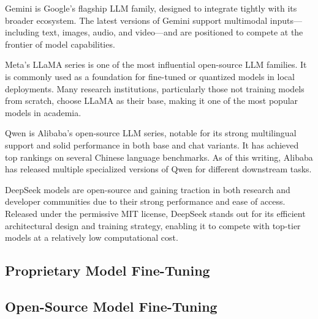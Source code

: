 Gemini is Google’s flagship LLM family, designed to integrate tightly with its broader ecosystem. The latest versions of Gemini support multimodal inputs—including text, images, audio, and video—and are positioned to compete at the frontier of model capabilities.

Meta’s LLaMA series is one of the most influential open-source LLM families. It is commonly used as a foundation for fine-tuned or quantized models in local deployments. Many research institutions, particularly those not training models from scratch, choose LLaMA as their base, making it one of the most popular models in academia.

Qwen is Alibaba’s open-source LLM series, notable for its strong multilingual support and solid performance in both base and chat variants. It has achieved top rankings on several Chinese language benchmarks. As of this writing, Alibaba has released multiple specialized versions of Qwen for different downstream tasks.

DeepSeek models are open-source and gaining traction in both research and developer communities due to their strong performance and ease of access. Released under the permissive MIT license, DeepSeek stands out for its efficient architectural design and training strategy, enabling it to compete with top-tier models at a relatively low computational cost.





\subsection{Proprietary Model Fine-Tuning}

\subsection{Open-Source Model Fine-Tuning}

